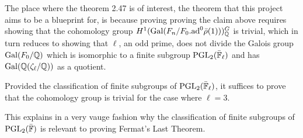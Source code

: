 The place where the theorem 2.47 is of interest, the theorem that this project aims to be a blueprint for, is because proving proving the claim above requires showing that the 
cohomology group  $H^1(\operatorname{Gal}(F_n / F_0. \textrm{ad}^0\bar{\rho}(1)))^G_{\mathbb{Q}}$ is trivial, which in turn reduces to showing that $\ell$, an odd prime, does not divide the Galois group $\operatorname{Gal}(F_0 /\mathbb{Q})$ which is isomorphic to a finite subgroup $\operatorname{PGL}_2(\bar{\mathbb{F}}_\ell)$
and has $\operatorname{Gal}(\mathbb{Q}(\zeta_\ell/\mathbb{Q}))$ as a quotient.

Provided the classification of finite subgroups of $\operatorname{PGL}_2(\bar{\mathbb{F}}_\ell)$, it suffices to prove that the cohomology group is trivial for the case where $\ell = 3$.

This explains in a very vauge fashion why the classification of finite subgroups of $\operatorname{PGL}_2(\bar{\mathbb{F}})$ is relevant to proving Fermat's Last Theorem.











